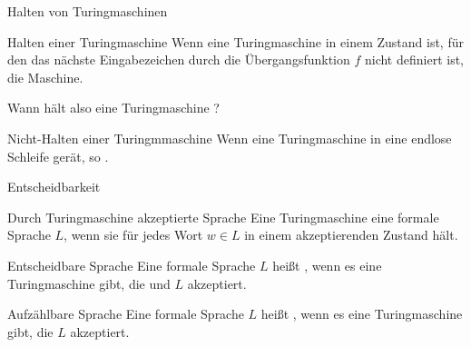 \documentclass{beamer}
\begin{document}
\begin{frame}{Halten von Turingmaschinen}
	
	\p
	
	\begin{block}{Halten einer Turingmaschine}
		Wenn eine Turingmaschine in einem Zustand ist, für den das nächste Eingabezeichen durch die Übergangsfunktion $f$ nicht definiert ist,  die Maschine.
	\end{block}

	\bp

	Wann hält also eine Turingmaschine ?
	
	\bp
	
	\begin{block}{Nicht-Halten einer Turingmmaschine}
		Wenn eine Turingmaschine in eine endlose Schleife gerät, so .
	\end{block}
\end{frame}

\begin{frame}{Entscheidbarkeit}
	\ip
	
	\begin{block}{Durch Turingmaschine akzeptierte Sprache}
		Eine Turingmaschine  eine formale Sprache $L$, wenn sie für jedes Wort $w \in L$ in einem akzeptierenden Zustand hält.
	\end{block}

	\bp

	\begin{block}{Entscheidbare Sprache}
		Eine formale Sprache $L$ heißt , wenn es eine Turingmaschine gibt, die  und $L$ akzeptiert.
	\end{block}

	\bp

	\begin{block}{Aufzählbare Sprache}
		Eine formale Sprache $L$ heißt , wenn es eine Turingmaschine gibt, die $L$ akzeptiert.
	\end{block}
\end{frame}
\end{document}
